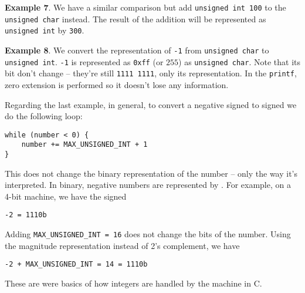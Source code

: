 \documentclass[a4paper]{article}
\begin{document}
\textbf{Example 7}. We have a similar comparison but add \texttt{unsigned int 100} to the \texttt{unsigned char} instead. The result of the addition will be represented as \texttt{unsigned int} by \texttt{300}.

\textbf{Example 8}. We convert the representation of \texttt{-1} from \texttt{unsigned char} to \texttt{unsigned int}. \texttt{-1} is represented as \texttt{0xff} (or $255$) as \texttt{unsigned char}. Note that its bit don't change -- they're still \texttt{1111 1111}, only its representation. In the \texttt{printf}, zero extension is performed so it doesn't lose any information.

Regarding the last example, in general, to convert a negative signed to signed we do the following loop:
\begin{verbatim}
while (number < 0) {
    number += MAX_UNSIGNED_INT + 1
}
\end{verbatim}
This does not change the binary representation of the number -- only the way it's interpreted. In binary, negative numbers are represented by . For example, on a 4-bit machine, we have the signed
\begin{verbatim}
-2 = 1110b
\end{verbatim}
Adding \texttt{MAX\_UNSIGNED\_INT = 16} does not change the bits of the number. Using the magnitude representation instead of 2's complement, we have
\begin{verbatim}
-2 + MAX_UNSIGNED_INT = 14 = 1110b
\end{verbatim}

These are were basics of how integers are handled by the machine in C.


\end{document}

